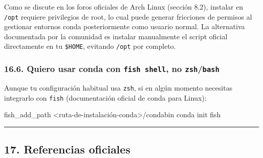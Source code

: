 \documentclass[
  doc,
  floatsintext,
  longtable,
  a4paper,
  nolmodern,
  notxfonts,
  notimes,
  12pt,
  colorlinks=true,linkcolor=blue,citecolor=blue,urlcolor=blue]{apa7}
\newenvironment{Shaded}{\begin{snugshade}}{\end{snugshade}}
\newcommand{\NormalTok}[1]{\textcolor[rgb]{0.00,0.23,0.31}{#1}}
\begin{document}
Como se discute en los foros oficiales de Arch Linux (sección 8.2),
instalar en \texttt{/opt} requiere privilegios de root, lo cual puede
generar fricciones de permisos al gestionar entornos conda
posteriormente como usuario normal. La alternativa documentada por la
comunidad es instalar manualmente el script oficial directamente en tu
\texttt{\$HOME}, evitando \texttt{/opt} por completo.

\subsubsection{\texorpdfstring{16.6. Quiero usar conda con
\texttt{fish\ shell}, no
\texttt{zsh}/\texttt{bash}}{16.6. Quiero usar conda con fish shell, no zsh/bash}}\label{quiero-usar-conda-con-fish-shell-no-zshbash}

Aunque tu configuración habitual usa \texttt{zsh}, si en algún momento
necesitas integrarlo con \texttt{fish} (documentación oficial de conda
para Linux):

\begin{Shaded}
\begin{Highlighting}[]
\NormalTok{fish\_add\_path \textless{}ruta{-}de{-}instalación{-}conda\textgreater{}/condabin}
\NormalTok{conda init fish}
\end{Highlighting}
\end{Shaded}

\begin{center}\rule{0.5\linewidth}{0.5pt}\end{center}

\subsection{17. Referencias oficiales}\label{referencias-oficiales}
\end{document}
